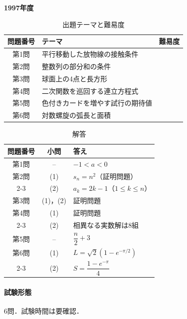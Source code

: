 \documentclass[../../main.tex]{subfiles}
\begin{document}
\begin{center}
  {\fontsize{48pt}{58pt}\selectfont \textbf{1997}\normalsize\textbf{年度}}
\end{center}

\begin{table}[htb]
  \centering
  \caption{出題テーマと難易度}
  \begin{tabular}{|c|p{9cm}|c|}
    \hline
    \textbf{問題番号} & \textbf{テーマ} & \textbf{難易度} \\
    \hline
    第1問 & 平行移動した放物線の接触条件 & \\
    \hline
    第2問 & 整数列の部分和の条件 & \\
    \hline
    第3問 & 球面上の4点と長方形 & \\
    \hline
    第4問 & 二次関数を巡回する連立方程式 & \\
    \hline
    第5問 & 色付きカードを増やす試行の期待値 & \\
    \hline
    第6問 & 対数螺旋の弧長と面積 & \\
    \hline
  \end{tabular}
\end{table}

\begin{table}[htb]
  \centering
  \caption{解答}
  \renewcommand{\arraystretch}{1.4}
  \begin{tabular}{|c|c|p{9cm}|}
    \hline
    \textbf{問題番号} & \textbf{小問} & \textbf{答え} \\
    \hline
    第1問 & -- & $-1<a<0$ \\
    \hline
    第2問 & (1) & $s_n=n^2$（証明問題） \\
    \cline{2-3}
    & (2) & $a_k=2k-1$（$1\le k\le n$） \\
    \hline
    第3問 & (1)，(2) & 証明問題 \\
    \hline
    第4問 & (1) & 証明問題 \\
    \cline{2-3}
    & (2) & 相異なる実数解は$8$組 \\
    \hline
    第5問 & -- & $\dfrac{n}{2}+3$ \\
    \hline
    第6問 & (1) & $L=\sqrt{2}(1-e^{-\pi/2})$ \\
    \cline{2-3}
    & (2) & $S=\dfrac{1-e^{-\pi}}{4}$ \\
    \hline
  \end{tabular}
\end{table}

\paragraph{試験形態}
6問．試験時間は要確認．
\end{document}
